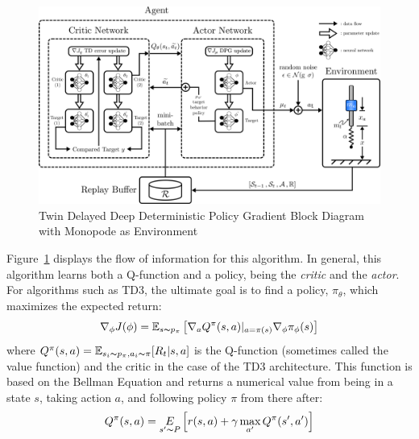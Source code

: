 \begin{figure}
  \includegraphics[width=\textwidth]{Figures/Ch1/TD3_Diagram.png}
  \caption{Twin Delayed Deep Deterministic Policy Gradient Block Diagram with Monopode as Environment}
  \label{fig:TD3}
\end{figure}

Figure~\ref{fig:TD3} displays the flow of information for this algorithm. In general, this algorithm learns both a Q-function and a policy, being the \textit{critic} and the \textit{actor}. For algorithms such as TD3, the ultimate goal is to find a policy, $\pi_{\theta}$, which maximizes the expected return:
% 
\begin{equation}
  \label{eq:expected_return}
  \begin{aligned}
    \nabla_{\phi} J(\phi) = \mathbb{E}_{s \thicksim p_{\pi}} \left [ \nabla_a Q^{\pi}(s,a)|_{a=\pi(s)} \nabla_{\phi}\pi_{\phi}(s) \right ]
  \end{aligned}
\end{equation}
%
where $Q^{\pi}(s,a) = \mathbb{E}_{s_i \thicksim p_{\pi}, a_i \thicksim \pi}[R_t|s,a]$ is the Q-function (sometimes called the value function) and the critic in the case of the TD3 architecture. This function is based on the Bellman Equation \cite{BellmanEquation} and returns a numerical value from being in a state $s$, taking action $a$, and following policy $\pi$ from there after:
% 
\begin{equation}
  \label{eq:bellman_eq}
  \begin{aligned}
    Q^{\pi}(s,a) = \underset{s' \thicksim P}{E} \left[ r(s,a) + \gamma \, \underset{a'}{\textup{max}} \, Q^{\pi}(s', a')  \right]
  \end{aligned}
\end{equation}
% 

